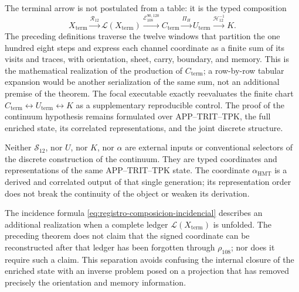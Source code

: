 \begin{remark}
The terminal arrow is not postulated from a table: it is the typed
composition
\[
 X_{\mathrm{term}}
 \xrightarrow{\mathcal R_{12}}\mathscr L(X_{\mathrm{term}})
 \xrightarrow{\mathcal E_{108}^{90,120}}C_{\mathrm{term}}
 \xrightarrow{\Pi_H}U_{\mathrm{term}}
 \xrightarrow{\mathcal H_{12}^{-1}}K .
\]
The preceding definitions traverse the twelve windows that partition the one
hundred eight steps and express each channel coordinate as a finite sum of its
visits and traces, with orientation, sheet, carry, boundary, and memory. This
is the mathematical realization of the production of
\(C_{\mathrm{term}}\); a row-by-row tabular expansion would be another
serialization of the same sum, not an additional premise of the theorem. The
focal executable exactly reevaluates the finite chart
\(C_{\mathrm{term}}\leftrightarrow U_{\mathrm{term}}\leftrightarrow K\)
as a supplementary reproducible control. The proof of the continuum
hypothesis remains formulated over APP--TRIT--TPK, the full enriched state,
its correlated representations, and the joint discrete structure.
\end{remark}

Neither \(\mathcal S_{12}\), nor \(U\), nor \(K\), nor \(\alpha\) are
external inputs or conventional selectors of the discrete construction of the
continuum. They are typed coordinates and representations of the same
APP--TRIT--TPK state. The coordinate \(\alpha_{\mathrm{HMT}}\) is a derived
and correlated output of that single generation; its representation order does
not break the continuity of the object or weaken its derivation.

The incidence formula \eqref{eq:registro-composicion-incidencial} describes an
additional realization when a complete ledger
\(\mathscr L(X_{\mathrm{term}})\) is unfolded. The preceding theorem does not
claim that the signed coordinate can be reconstructed after that ledger has
been forgotten through \(\rho_{108}\); nor does it require such a claim. This
separation avoids confusing the internal closure of the enriched state with
an inverse problem posed on a projection that has removed precisely the
orientation and memory information.

